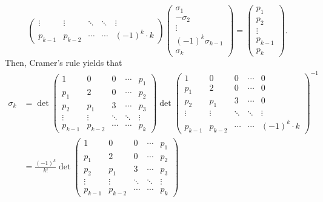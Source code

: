 \documentclass[letterpaper, 11pt, oneside]{book}
\begin{document}
\begin{sol}
\[\begin{pmatrix}
    \vdots & \vdots & \ddots & \ddots & \vdots \\
    p_{k - 1} & p_{k - 2} & \cdots & \cdots & (-1)^{k} \cdot k
  \end{pmatrix}
  \begin{pmatrix}
    \sigma_{1} \\
    -\sigma_{2} \\
    \vdots \\
    (-1)^{k} \sigma_{k - 1} \\
    \sigma_{k}
  \end{pmatrix}
  =
  \begin{pmatrix}
    p_{1} \\
    p_{2} \\
    \vdots \\
    p_{k - 1} \\
    p_{k}
  \end{pmatrix}.
\]
Then, Cramer's rule yields that
\begin{align*}
  \sigma_{k} &=
  \det
  \begin{pmatrix}
    1 & 0 & 0 & \cdots & p_{1} \\
    p_{1} & 2 & 0 & \cdots & p_{2} \\
    p_{2} & p_{1} & 3 & \cdots & p_{3} \\
    \vdots & \vdots & \ddots & \ddots & \vdots \\
    p_{k - 1} & p_{k - 2} & \cdots & \cdots & p_{k}
  \end{pmatrix}
  \det
  \begin{pmatrix}
    1 & 0 & 0 & \cdots & 0 \\
    p_{1} & 2 & 0 & \cdots & 0 \\
    p_{2} & p_{1} & 3 & \cdots & 0 \\
    \vdots & \vdots & \ddots & \ddots & \vdots \\
    p_{k - 1} & p_{k - 2} & \cdots & \cdots & (-1)^{k} \cdot k
  \end{pmatrix}^{-1} \\
    &= \frac{(-1)^{k}}{k!}
  \det
  \begin{pmatrix}
    1 & 0 & 0 & \cdots & p_{1} \\
    p_{1} & 2 & 0 & \cdots & p_{2} \\
    p_{2} & p_{1} & 3 & \cdots & p_{3} \\
    \vdots & \vdots & \ddots & \ddots & \vdots \\
    p_{k - 1} & p_{k - 2} & \cdots & \cdots & p_{k}
  \end{pmatrix} \\

\end{align*}
\end{sol}
\end{document}
